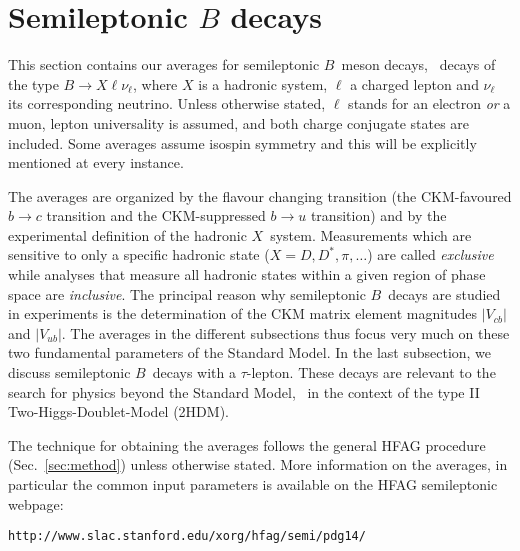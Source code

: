 

\section{Semileptonic $B$ decays}
\label{sec:slbdecays}

This section contains our averages for semileptonic $B$~meson decays,
\ie\ decays of the type $B\to X\ell\nu_\ell$, where $X$ is a
hadronic system, $\ell$ a charged lepton and $\nu_\ell$ its corresponding
neutrino. Unless otherwise stated, $\ell$ stands for an electron
\emph{or} a muon, lepton universality is assumed, and both charge
conjugate states are included. Some averages assume isospin symmetry
and this will be explicitly mentioned at every instance.

The averages are organized by the flavour changing transition
(the CKM-favoured $b\to c$ transition and the CKM-suppressed $b\to u$
transition) and by the experimental definition of the hadronic
$X$~system. Measurements which are sensitive to only a specific
hadronic state ($X=D,D^*,\pi,\dots$) are called \emph{exclusive} while
analyses that measure all hadronic states within a given region of
phase space are \emph{inclusive}. The principal reason why semileptonic
$B$~decays are studied in experiments is the determination of the CKM
matrix element magnitudes $|V_{cb}|$ and $|V_{ub}|$. The averages in
the different subsections thus focus very much on these two
fundamental parameters of the Standard Model. In the last subsection,
we discuss semileptonic $B$~decays with a $\tau$-lepton. These
decays are relevant to the search for physics beyond the Standard
Model, \eg\ in the context of the type II
Two-Higgs-Doublet-Model (2HDM).

The technique for obtaining the averages follows the general HFAG
procedure (Sec.~\ref{sec:method}) unless otherwise stated. More
information on the averages, in particular the common input parameters
is available on the HFAG semileptonic webpage:

\centerline{\tt http://www.slac.stanford.edu/xorg/hfag/semi/pdg14/}




